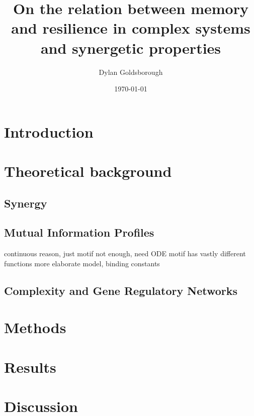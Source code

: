 \documentclass{article}
\title{On the relation between memory and resilience in complex systems and synergetic properties}
\author{Dylan Goldsborough}
\date{\today}
\begin{document}
\maketitle



\section{Introduction}



\section{Theoretical background}

\subsection{Synergy}



\subsection{Mutual Information Profiles}



continuous reason, just motif not enough, need ODE
motif has vastly different functions
more elaborate model, binding constants

\subsection{Complexity and Gene Regulatory Networks}



\section{Methods}



\section{Results}



\section{Discussion}




\end{document}
